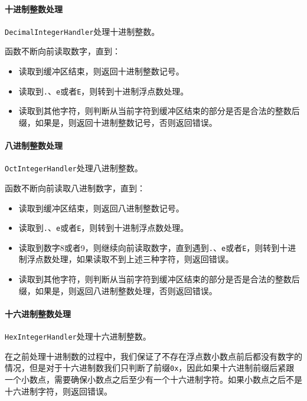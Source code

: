 \documentclass[lang=cn,11pt,a4paper,cite=authornum]{paper}
\begin{document}
\paragraph{十进制整数处理} \texttt{DecimalIntegerHandler}处理十进制整数。

函数不断向前读取数字，直到：

\begin{itemize}
    \item 读取到缓冲区结束，则返回十进制整数记号。
    \item 读取到\texttt{.}、\texttt{e}或者\texttt{E}，则转到十进制浮点数处理。
    \item 读取到其他字符，则判断从当前字符到缓冲区结束的部分是否是合法的整数后缀，如果是，则返回十进制整数记号，否则返回错误。
\end{itemize}

\paragraph{八进制整数处理} \texttt{OctIntegerHandler}处理八进制整数。

函数不断向前读取八进制数字，直到：

\begin{itemize}
    \item 读取到缓冲区结束，则返回八进制整数记号。
    \item 读取到\texttt{.}、\texttt{e}或者\texttt{E}，则转到十进制浮点数处理。
    \item 读取到数字8或者9，则继续向前读取数字，直到遇到\texttt{.}、\texttt{e}或者\texttt{E}，则转到十进制浮点数处理，如果读取不到上述三种字符，则返回错误。
    \item 读取到其他字符，则判断从当前字符到缓冲区结束的部分是否是合法的整数后缀，如果是，则返回八进制整数处理，否则返回错误。
\end{itemize}

\paragraph{十六进制整数处理} \texttt{HexIntegerHandler}处理十六进制整数。

在之前处理十进制数的过程中，我们保证了不存在浮点数小数点前后都没有数字的情况，但是对于十六进制数我们只判断了前缀\texttt{0x}，因此如果十六进制前缀后紧跟一个小数点，需要确保小数点之后至少有一个十六进制字符。如果小数点之后不是十六进制字符，则返回错误。
\end{document}
